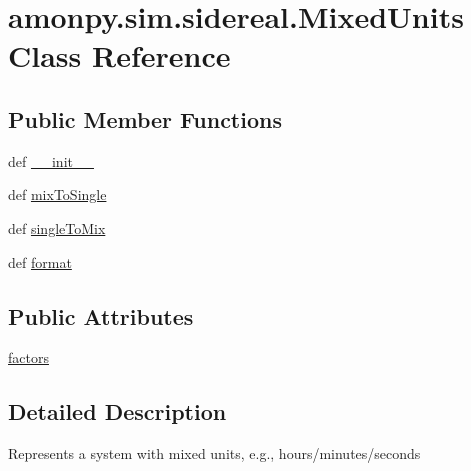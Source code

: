 \hypertarget{classamonpy_1_1sim_1_1sidereal_1_1_mixed_units}{\section{amonpy.\-sim.\-sidereal.\-Mixed\-Units Class Reference}
\label{classamonpy_1_1sim_1_1sidereal_1_1_mixed_units}
}
\subsection*{Public Member Functions}
\begin{DoxyCompactItemize}
\item 
def \hyperlink{classamonpy_1_1sim_1_1sidereal_1_1_mixed_units_ae013673eef30b196f86b6f2c486b3bd8}{\-\_\-\-\_\-init\-\_\-\-\_\-}
\item 
def \hyperlink{classamonpy_1_1sim_1_1sidereal_1_1_mixed_units_a7f7c5351e7552b3a52f3c2627f3efc16}{mix\-To\-Single}
\item 
def \hyperlink{classamonpy_1_1sim_1_1sidereal_1_1_mixed_units_a631ae021c6ea42cab1237ee08e12c0cd}{single\-To\-Mix}
\item 
def \hyperlink{classamonpy_1_1sim_1_1sidereal_1_1_mixed_units_a25bd5d0dd86c8a6bebc073c838389c01}{format}
\end{DoxyCompactItemize}
\subsection*{Public Attributes}
\begin{DoxyCompactItemize}
\item 
\hyperlink{classamonpy_1_1sim_1_1sidereal_1_1_mixed_units_a69ff4aed75529b62b39cc23e1e9ed790}{factors}
\end{DoxyCompactItemize}


\subsection{Detailed Description}
\begin{DoxyVerb}Represents a system with mixed units, e.g., hours/minutes/seconds
\end{DoxyVerb}
 

